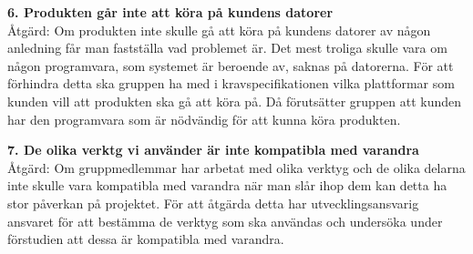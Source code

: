 \documentclass[a4paper,10pt, twoside]{article}
\begin{document}
\textbf{6. Produkten går inte att köra på kundens datorer}\\
Åtgärd: Om produkten inte skulle gå att köra på kundens datorer av någon anledning får man fastställa vad problemet är. Det mest troliga skulle vara om någon programvara, som systemet är beroende av, saknas på datorerna. För att förhindra detta ska gruppen ha med i kravspecifikationen vilka plattformar som kunden vill att produkten ska gå att köra på. Då förutsätter gruppen att kunden har den programvara som är nödvändig för att kunna köra produkten.

\textbf{7. De olika verktg vi använder är inte kompatibla med varandra}\\
Åtgärd: Om gruppmedlemmar har arbetat med olika verktyg och de olika delarna inte skulle vara kompatibla med varandra när man slår ihop dem kan detta ha stor påverkan på projektet. För att åtgärda detta har utvecklingsansvarig ansvaret för att bestämma de verktyg som ska användas och undersöka under förstudien att dessa är kompatibla med varandra.

\clearpage
\printbibliography
\end{document}
